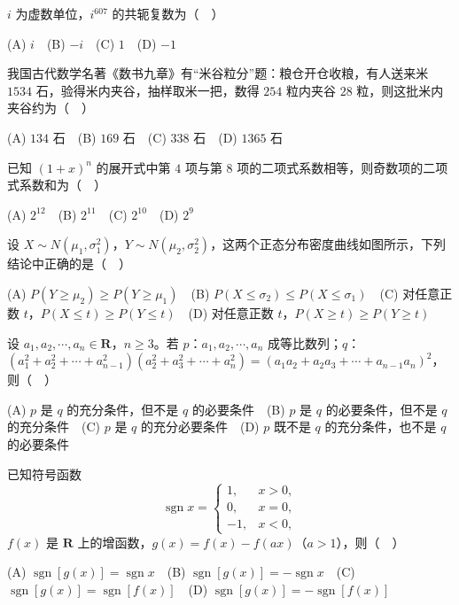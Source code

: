 

\begin{question}
\(i\) 为虚数单位，\(i^{607}\) 的共轭复数为（　）

(A) \(i\)　(B) \(-i\)　(C) \(1\)　(D) \(-1\)

\end{question}
\begin{question}
我国古代数学名著《数书九章》有“米谷粒分”题：粮仓开仓收粮，有人送来米 \(1534\) 石，验得米内夹谷，抽样取米一把，数得 \(254\) 粒内夹谷 \(28\) 粒，则这批米内夹谷约为（　）

(A) \(134\) 石　(B) \(169\) 石　(C) \(338\) 石　(D) \(1365\) 石

\end{question}
\begin{question}
已知 \((1+x)^n\) 的展开式中第 \(4\) 项与第 \(8\) 项的二项式系数相等，则奇数项的二项式系数和为（　）

(A) \(2^{12}\)　(B) \(2^{11}\)　(C) \(2^{10}\)　(D) \(2^9\)

\Needspace{0.4\textheight}
\end{question}
\begin{question}
设 \(X\sim N(\mu_1,\sigma_1^2)\)，\(Y\sim N(\mu_2,\sigma_2^2)\)，这两个正态分布密度曲线如图所示，下列结论中正确的是（　）
\nopagebreak[4]
\begin{center}\end{center}
\nopagebreak[4]
(A) \(P(Y\geqslant\mu_2)\geqslant P(Y\geqslant\mu_1)\)　(B) \(P(X\leqslant\sigma_2)\leqslant P(X\leqslant\sigma_1)\)　(C) 对任意正数 \(t\)，\(P(X\leqslant t)\geqslant P(Y\leqslant t)\)　(D) 对任意正数 \(t\)，\(P(X\geqslant t)\geqslant P(Y\geqslant t)\)

\end{question}
\begin{question}
设 \(a_1,a_2,\cdots,a_n\in\mathbf{R}\)，\(n\geqslant3\)。若 \(p\)：\(a_1,a_2,\cdots,a_n\) 成等比数列；\(q\)：\((a_1^2+a_2^2+\cdots+a_{n-1}^2)(a_2^2+a_3^2+\cdots+a_n^2)=(a_1a_2+a_2a_3+\cdots+a_{n-1}a_n)^2\)，则（　）

(A) \(p\) 是 \(q\) 的充分条件，但不是 \(q\) 的必要条件　(B) \(p\) 是 \(q\) 的必要条件，但不是 \(q\) 的充分条件　(C) \(p\) 是 \(q\) 的充分必要条件　(D) \(p\) 既不是 \(q\) 的充分条件，也不是 \(q\) 的必要条件

\end{question}
\begin{question}
已知符号函数
\nopagebreak[4]
\[
\operatorname{sgn}x=\begin{cases}
1, & x>0,\\
0, & x=0,\\
-1, & x<0,
\end{cases}
\]
\(f(x)\) 是 \(\mathbf{R}\) 上的增函数，\(g(x)=f(x)-f(ax)\)（\(a>1\)），则（　）

(A) \(\operatorname{sgn}[g(x)]=\operatorname{sgn}x\)　(B) \(\operatorname{sgn}[g(x)]=-\operatorname{sgn}x\)　(C) \(\operatorname{sgn}[g(x)]=\operatorname{sgn}[f(x)]\)　(D) \(\operatorname{sgn}[g(x)]=-\operatorname{sgn}[f(x)]\)

\end{question}
